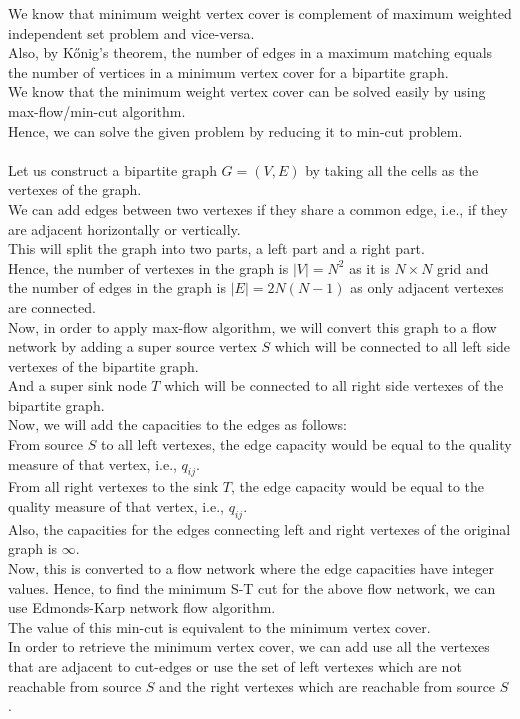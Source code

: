 \documentclass[12pt]{article}
\begin{document}
\begin{enumerate}
We know that minimum weight vertex cover is complement of maximum weighted independent set problem and vice-versa. \\
Also, by K\H{o}nig's theorem, the number of edges in a maximum matching equals the number of vertices in a minimum vertex cover for a bipartite graph.\\
We know that the minimum weight vertex cover can be solved easily by using max-flow/min-cut algorithm.\\
Hence, we can solve the given problem by reducing it to min-cut problem.\\\\
Let us construct a bipartite graph $G=(V,E)$ by taking all the cells as the vertexes of the graph.\\
We can add edges between two vertexes if they share a common edge, i.e., if they are adjacent horizontally or vertically.\\
This will split the graph into two parts, a left part and a right part.\\
Hence, the number of vertexes in the graph is $|V| = N^2$ as it is $N \times N$ grid and the number of edges in the graph is $|E| = 2N(N-1)$ as only adjacent vertexes are connected.\\
Now, in order to apply max-flow algorithm, we will convert this graph to a flow network by adding a super source vertex $S$ which will be connected to all left side vertexes of the bipartite graph.\\
And a super sink node $T$ which will be connected to all right side vertexes of the bipartite graph.\\
Now, we will add the capacities to the edges as follows:\\
From source $S$ to all left vertexes, the edge capacity would be equal to the quality measure of that vertex, i.e., $q_{ij}$.\\
From all right vertexes to the sink $T$, the edge capacity would be equal to the quality measure of that vertex, i.e., $q_{ij}$.\\
Also, the capacities for the edges connecting left and right vertexes of the original graph is $\infty$.\\
Now, this is converted to a flow network where the edge capacities have integer values.
Hence, to find the minimum S-T cut for the  above flow network, we can use Edmonds-Karp network flow algorithm.\\
The value of this min-cut is equivalent to the minimum vertex cover.\\
In order to retrieve the minimum vertex cover, we can add use all the vertexes that are adjacent to cut-edges or use the set of left vertexes which are not reachable from source $S$ and the right vertexes which are reachable from source $S$.


\end{enumerate}
\end{document}
